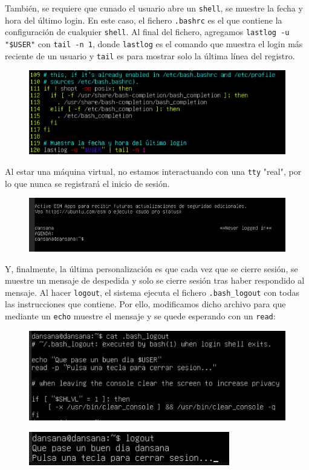 \documentclass[10pt]{article}
\begin{document}
	También, se requiere que cunado el usuario abre un \verb|shell|, se muestre la fecha y hora del último login. En este caso, el fichero \verb|.bashrc| es el que contiene la configuración de cualquier \verb|shell|. Al final del fichero, agregamos \verb|lastlog -u "$USER"| con \verb|tail -n 1|, donde \verb|lastlog| es el comando que muestra el login más reciente de un usuario y \verb|tail| es para mostrar solo la última línea del registro.
	\begin{figure}[H]
		\setlength{\abovecaptionskip}{0cm}
		\setlength{\belowcaptionskip}{0cm}
		\centering
		\includegraphics[width=0.7\linewidth]{Recursos/bashrc.png}
	\end{figure}
	Al estar una máquina virtual, no estamos interactuando con una \verb|tty|  "real", por lo que nunca se registrará el inicio de sesión.
	\begin{figure}[H]
		\setlength{\abovecaptionskip}{0cm}
		\setlength{\belowcaptionskip}{0cm}
		\centering
		\includegraphics[width=0.7\linewidth]{Recursos/lastlog.png}
	\end{figure}
	Y, finalmente, la última personalización es que cada vez que se cierre sesión, se muestre un mensaje de despedida y solo se cierre sesión tras haber respondido al mensaje. Al hacer \verb|logout|, el sistema ejecuta el fichero \verb|.bash_logout| con todas las instrucciones que contiene. Por ello, modificamos dicho archivo para que mediante un \verb|echo| muestre el mensaje y se quede esperando con un \verb|read|:
	\begin{figure}[H]
		\setlength{\abovecaptionskip}{0cm}
		\setlength{\belowcaptionskip}{0cm}
		\centering
		\includegraphics[width=0.7\linewidth]{Recursos/logout.png}
	\end{figure}
	\begin{figure}[H]
		\setlength{\abovecaptionskip}{0cm}
		\setlength{\belowcaptionskip}{0cm}
		\centering
		\includegraphics[width=0.7\linewidth]{Recursos/logout1.png}
	\end{figure}
	\clearpage
	
\end{document}
